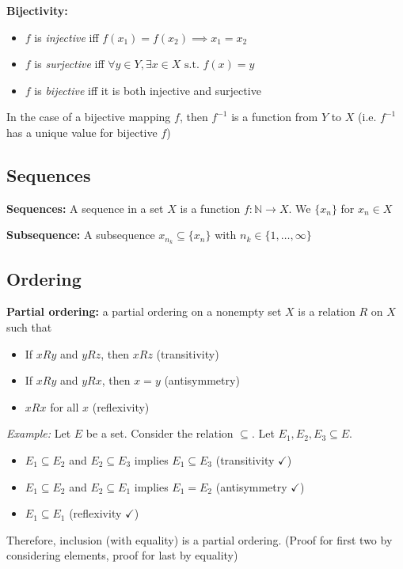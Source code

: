 \documentclass[12pt]{article}
\newcommand{\N}{\mathbb{N}}
\newcommand{\sub}{\subseteq}
\newcommand{\st}{\text{ s.t. }}
\begin{document}
    \textbf{Bijectivity:}
    \begin{itemize}
        \item $f$ is \emph{injective} iff $f(x_1) = f(x_2) \implies x_1 = x_2$
        \item $f$ is \emph{surjective} iff $\forall y \in Y, \exists x \in X \st f(x) = y$
        \item $f$ is \emph{bijective} iff it is both injective and surjective
    \end{itemize}

    In the case of a bijective mapping $f$, then $f^{-1}$ is a function from $Y$ to $X$ (i.e. $f^{-1}$ has a unique value for bijective $f$)

    \subsection*{Sequences}
    \textbf{Sequences:} A sequence in a set $X$ is a function $f: \N \to X$. We $\{x_n\}$ for $x_n \in X$
    
    \textbf{Subsequence:} A subsequence $x_{n_k} \subseteq \{x_n\}$ with $n_k \in \{1, \dots, \infty\}$

    \subsection*{Ordering}
    \textbf{Partial ordering:} a partial ordering on a nonempty set $X$ is a relation $R$ on $X$ such that 
    \begin{itemize}
        \item If $xRy$ and $yRz$, then $xRz$ (transitivity)
        \item If $xRy$ and $yRx$, then $x = y$ (antisymmetry)
        \item $xRx$ for all $x$ (reflexivity)
    \end{itemize}

    \emph{Example:} Let $E$ be a set. Consider the relation $\sub$. Let $E_1, E_2, E_3 \sub E$.
    \begin{itemize}
        \item $E_1 \sub E_2$ and $E_2 \sub E_3$ implies $E_1 \sub E_3$ (transitivity $\checkmark$)
        \item $E_1 \sub E_2$ and $E_2 \sub E_1$ implies $E_1 = E_2$ (antisymmetry $\checkmark$)
        \item $E_1 \sub E_1$ (reflexivity $\checkmark$)
    \end{itemize}
    Therefore, inclusion (with equality) is a partial ordering.
    (Proof for first two by considering elements, proof for last by equality)
\end{document}
